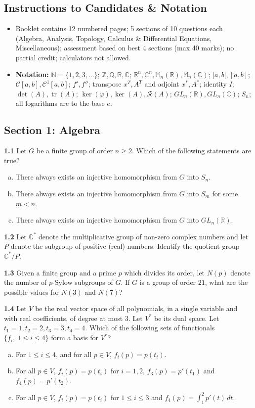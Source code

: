 \documentclass[11pt,a4paper]{article}
\newcommand{\N}{\mathbb{N}}
\newcommand{\Z}{\mathbb{Z}}
\newcommand{\Q}{\mathbb{Q}}
\newcommand{\R}{\mathbb{R}}
\newcommand{\C}{\mathbb{C}}
\newcommand{\M}{\mathbb{M}}
\newcommand{\tr}{\operatorname{tr}}
\newcommand{\examsec}[1]{%
  \subsection*{#1}
  \vspace{-2pt}
}
\newcommand{\qitem}[1]{\par\medskip\noindent\textbf{#1}\hspace{0.5em}}
\begin{document}
\subsection*{Instructions to Candidates \& Notation}
\begin{itemize}
  \item Booklet contains 12 numbered pages; 5 sections of 10 questions each (Algebra, Analysis, Topology, Calculus \& Differential Equations, Miscellaneous); assessment based on best 4 sections (max 40 marks); no partial credit; calculators not allowed.
  \item \textbf{Notation:} $\N = \{1, 2, 3, \dots\}$; $\Z, \Q, \R, \C$; $\R^n, \C^n, \M_n(\R), \M_n(\C)$; $]a, b[, [a, b]$; $\mathcal{C}[a, b], \mathcal{C}^1[a, b]$; $f', f''$; transpose $x^T, A^T$ and adjoint $x^*, A^*$; identity $I$; $\det(A), \tr(A)$; $\ker(\varphi), \ker(A), \mathcal{R}(A)$; $GL_n(\R), GL_n(\C)$; $S_n$; all logarithms are to the base $e$.
\end{itemize}

\examsec{Section 1: Algebra}

\qitem{1.1} Let $G$ be a finite group of order $n \ge 2$. Which of the following statements are true?
\begin{enumerate}[a.]
  \item There always exists an injective homomorphism from $G$ into $S_n$.
  \item There always exists an injective homomorphism from $G$ into $S_m$ for some $m < n$.
  \item There always exists an injective homomorphism from $G$ into $GL_n(\R)$.
\end{enumerate}

\qitem{1.2} Let $\C^*$ denote the multiplicative group of non-zero complex numbers and let $P$ denote the subgroup of positive (real) numbers. Identify the quotient group $\C^*/P$.

\qitem{1.3} Given a finite group and a prime $p$ which divides its order, let $N(p)$ denote the number of $p$-Sylow subgroups of $G$. If $G$ is a group of order $21$, what are the possible values for $N(3)$ and $N(7)$?

\qitem{1.4} Let $V$ be the real vector space of all polynomials, in a single variable and with real coefficients, of degree at most $3$. Let $V^*$ be its dual space. Let $t_1 = 1, t_2 = 2, t_3 = 3, t_4 = 4$. Which of the following sets of functionals $\{f_i,\ 1 \le i \le 4\}$ form a basis for $V^*$?
\begin{enumerate}[a.]
  \item For $1 \le i \le 4$, and for all $p \in V$, $f_i(p) = p(t_i)$.
  \item For all $p \in V$, $f_i(p) = p(t_i)$ for $i = 1, 2$, $f_3(p) = p'(t_1)$ and $f_4(p) = p'(t_2)$.
  \item For all $p \in V$, $f_i(p) = p(t_i)$ for $1 \le i \le 3$ and $f_4(p) = \int_1^2 p'(t)\,dt$.
\end{enumerate}
\end{document}
